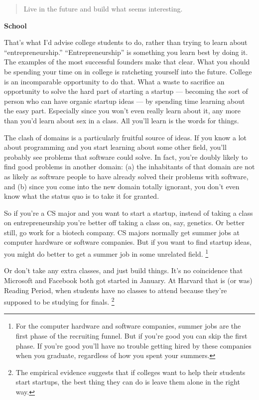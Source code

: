 \begin{quote}
Live in the future and build what seems interesting.
\end{quote}

\textbf{School}

That's what I'd advise college students to do, rather than trying to
learn about ``entrepreneurship.'' ``Entrepreneurship'' is something you
learn best by doing it. The examples of the most successful founders
make that clear. What you should be spending your time on in college is
ratcheting yourself into the future. College is an incomparable
opportunity to do that. What a waste to sacrifice an opportunity to
solve the hard part of starting a startup --- becoming the sort of
person who can have organic startup ideas --- by spending time learning
about the easy part. Especially since you won't even really learn about
it, any more than you'd learn about sex in a class. All you'll learn is
the words for things.

The clash of domains is a particularly fruitful source of ideas. If you
know a lot about programming and you start learning about some other
field, you'll probably see problems that software could solve. In fact,
you're doubly likely to find good problems in another domain: (a) the
inhabitants of that domain are not as likely as software people to have
already solved their problems with software, and (b) since you come into
the new domain totally ignorant, you don't even know what the status quo
is to take it for granted.

So if you're a CS major and you want to start a startup, instead of
taking a class on entrepreneurship you're better off taking a class on,
say, genetics. Or better still, go work for a biotech company. CS majors
normally get summer jobs at computer hardware or software companies. But
if you want to find startup ideas, you might do better to get a summer
job in some unrelated field. \footnote{For the computer hardware and software companies, summer jobs
are the first phase of the recruiting funnel. But if you're good you can
skip the first phase. If you're good you'll have no trouble getting
hired by these companies when you graduate, regardless of how you spent
your summers.}

Or don't take any extra classes, and just build things. It's no
coincidence that Microsoft and Facebook both got started in January. At
Harvard that is (or was) Reading Period, when students have no classes
to attend because they're supposed to be studying for finals.
\footnote{The empirical evidence suggests that if colleges want to help
their students start startups, the best thing they can do is leave them
alone in the right way.}

